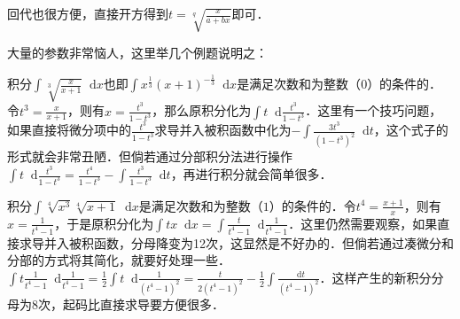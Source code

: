 \documentclass{ctexbook}
\newcommand*{\dif}{\mathop{}\!\mathrm{d}}
\begin{document}
回代也很方便，直接开方得到$t=\sqrt[q]{\frac{x}{a+bx}}$即可．\par
大量的参数非常恼人，这里举几个例题说明之：\par
积分$\int\sqrt[3]{\frac{x}{x+1}}\dif{x}$也即$\int x^{\frac{1}{3}}\left(x+1\right)^{-\frac{1}{3}}\dif{x}$是满足次数和为整数（$0$）的条件的．令$t^{3}=\frac{x}{x+1}$，则有$x=\frac{t^{3}}{1-t^{3}}$，那么原积分化为$\int t\dif{\frac{t^{3}}{1-t^{3}}}$．这里有一个技巧问题，如果直接将微分项中的$\frac{t^{3}}{1-t^{3}}$求导并入被积函数中化为$-\int\frac{3t^{3}}{\left(1-t^{3}\right)^{2}}\dif{t}$，这个式子的形式就会非常丑陋．但倘若通过分部积分法进行操作$\int t\dif{\frac{t^{3}}{1-t^{3}}}=\frac{t^{4}}{1-t^{3}}-\int\frac{t^{3}}{1-t^{3}}\dif{t}$，再进行积分就会简单很多．\par
积分$\int\sqrt[4]{x^{3}}\sqrt[4]{x+1}\dif{x}$是满足次数和为整数（$1$）的条件的．令$t^{4}=\frac{x+1}{x}$，则有$x=\frac{1}{t^{4}-1}$，于是原积分化为$\int tx\dif{x}=\int\frac{t}{t^{4}-1}\dif{\frac{1}{t^{4}-1}}$．这里仍然需要观察，如果直接求导并入被积函数，分母降变为12次，这显然是不好办的．但倘若通过凑微分和分部的方式将其简化，就要好处理一些．$\int t\frac{1}{t^{4}-1}\dif{\frac{1}{t^{4}-1}}=\frac{1}{2}\int t\dif{\frac{1}{\left(t^{4}-1\right)^{2}}}=\frac{t}{2\left(t^{4}-1\right)^{2}}-\frac{1}{2}\int\frac{\dif{t}}{\left(t^{4}-1\right)^{2}}$．这样产生的新积分分母为8次，起码比直接求导要方便很多．\par
\end{document}
